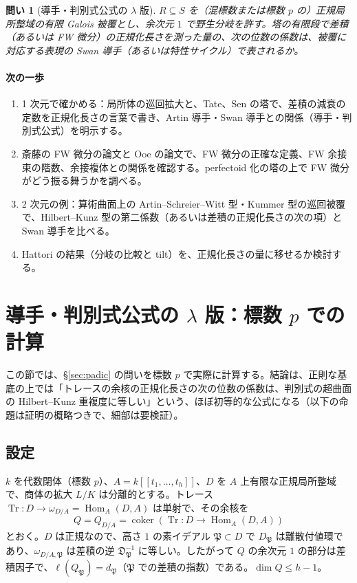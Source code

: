 \documentclass[11pt,a4paper]{ltjsarticle}
\theoremstyle{plain}
\newtheorem{question}{問い}
\theoremstyle{definition}
\theoremstyle{remark}
\theoremstyle{plain}
\newcommand{\Hom}{\operatorname{Hom}}
\newcommand{\Tr}{\operatorname{Tr}}
\begin{document}
\begin{question}[導手・判別式公式の $\lambda$ 版]
$R\subseteq S$ を（混標数または標数 $p$ の）正規局所整域の有限 Galois 被覆とし、余次元 $1$ で野生分岐を許す。塔の有限段で差積（あるいは FW 微分）の正規化長さを測った量の、次の位数の係数は、被覆に対応する表現の Swan 導手（あるいは特性サイクル）で表されるか。
\end{question}

\paragraph{次の一歩}
\begin{enumerate}
  \item 1 次元で確かめる：局所体の巡回拡大と、Tate、Sen の塔で、差積の減衰の定数を正規化長さの言葉で書き、Artin 導手・Swan 導手との関係（導手・判別式公式）を明示する。
  \item 斎藤の FW 微分の論文と Ooe の論文で、FW 微分の正確な定義、FW 余接束の階数、余接複体との関係を確認する。perfectoid 化の塔の上で FW 微分がどう振る舞うかを調べる。
  \item 2 次元の例：算術曲面上の Artin--Schreier--Witt 型・Kummer 型の巡回被覆で、Hilbert--Kunz 型の第二係数（あるいは差積の正規化長さの次の項）と Swan 導手を比べる。
  \item Hattori の結果（分岐の比較と tilt）を、正規化長さの量に移せるか検討する。
\end{enumerate}

\section{導手・判別式公式の $\lambda$ 版：標数 $p$ での計算}\label{sec:disc}

この節では、\S\ref{sec:padic} の問いを標数 $p$ で実際に計算する。結論は、正則な基底の上では「トレースの余核の正規化長さの次の位数の係数は、判別式の超曲面の Hilbert--Kunz 重複度に等しい」という、ほぼ初等的な公式になる（以下の命題は証明の概略つきで、細部は要検証）。

\subsection{設定}
$k$ を代数閉体（標数 $p$）、$A = k[[t_1,\dots,t_h]]$、$D$ を $A$ 上有限な正規局所整域で、商体の拡大 $L/K$ は分離的とする。トレース $\Tr\colon D\to\omega_{D/A} = \Hom_A(D,A)$ は単射で、その余核を
\[
  Q = Q_{D/A} = \operatorname{coker}(\Tr\colon D\to\Hom_A(D,A))
\]
とおく。$D$ は正規なので、高さ $1$ の素イデアル $\mathfrak{P}\subset D$ で $D_\mathfrak{P}$ は離散付値環であり、$\omega_{D/A,\mathfrak{P}}$ は差積の逆 $\mathfrak{D}^{-1}_\mathfrak{P}$ に等しい。したがって $Q$ の余次元 $1$ の部分は差積因子で、$\ell(Q_\mathfrak{P}) = d_\mathfrak{P}$（$\mathfrak{P}$ での差積の指数）である。$\dim Q\le h-1$。
\end{document}
